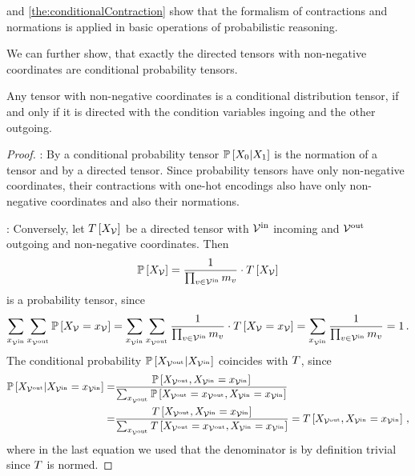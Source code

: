  and \ref{the:conditionalContraction} show that the formalism of contractions and normations is applied in basic operations of probabilistic reasoning.

We can further show, that exactly the directed tensors with non-negative coordinates are conditional probability tensors.

\begin{theorem}\label{the:conditionalDirected}
	Any tensor with non-negative coordinates is a conditional distribution tensor, if and only if it is directed with the condition variables ingoing and the other outgoing.
\end{theorem}
\begin{proof}
	\proofrightsymbol:
	By  a conditional probability tensor $\mathbb{P}\left[X_{0}|X_{1}\right]$ is the normation of a tensor and by  a directed tensor.
	Since probability tensors have only non-negative coordinates, their contractions with one-hot encodings also have only non-negative coordinates and also their normations. 
	
	\proofleftsymbol:
	Conversely, let $T\left[X_{\mathcal{V}}\right]$ be a directed tensor with $\mathcal{V}^{\mathrm{in}}$ incoming and $\mathcal{V}^{\mathrm{out}}$ outgoing and non-negative coordinates.
	Then
	\begin{align}
		\mathbb{P}\left[X_{\mathcal{V}}\right] = \frac{1}{\prod_{v\in\mathcal{V}^{\mathrm{in}}}m_{v}} \cdot T\left[X_{\mathcal{V}}\right]
	\end{align}
	is a probability tensor, since 
	\begin{align*}
		\sum_{x_{\mathcal{V}^{\mathrm{in}}}} \sum_{x_{\mathcal{V}^{\mathrm{out}}}} \mathbb{P}\left[X_{\mathcal{V}}=x_{\mathcal{V}}\right] =
		\sum_{x_{\mathcal{V}^{\mathrm{in}}}} \sum_{x_{\mathcal{V}^{\mathrm{out}}}} \frac{1}{\prod_{v\in\mathcal{V}^{\mathrm{in}}}m_{v}} \cdot T\left[X_{\mathcal{V}}=x_{\mathcal{V}}\right] =
		\sum_{x_{\mathcal{V}^{\mathrm{in}}}} \frac{1}{\prod_{v\in\mathcal{V}^{\mathrm{in}}}m_{v}} = 1 \, . 
	\end{align*}
	The conditional probability $\mathbb{P}\left[X_{\mathcal{V}^{\mathrm{out}}}|X_{\mathcal{V}^{\mathrm{in}}}\right]$ coincides with $T$, since
	\begin{align*}
		\mathbb{P}\left[X_{\mathcal{V}^{\mathrm{out}}}|X_{\mathcal{V}^{\mathrm{in}}}=x_{\mathcal{V}^{\mathrm{in}}}\right] 
		=& \frac{
		\mathbb{P}\left[X_{\mathcal{V}^{\mathrm{out}}},X_{\mathcal{V}^{\mathrm{in}}}=x_{\mathcal{V}^{\mathrm{in}}}\right]
		}{
		\sum_{x_{\mathcal{V}^{\mathrm{out}}}} \mathbb{P}\left[X_{\mathcal{V}^{\mathrm{out}}}=x_{\mathcal{V}^{\mathrm{out}}},X_{\mathcal{V}^{\mathrm{in}}}=x_{\mathcal{V}^{\mathrm{in}}}\right]
		} \\
		=& \frac{
		T\left[X_{\mathcal{V}^{\mathrm{out}}},X_{\mathcal{V}^{\mathrm{in}}}=x_{\mathcal{V}^{\mathrm{in}}}\right]
		}{
		\sum_{x_{\mathcal{V}^{\mathrm{out}}}} T\left[X_{\mathcal{V}^{\mathrm{out}}}=x_{\mathcal{V}^{\mathrm{out}}},X_{\mathcal{V}^{\mathrm{in}}}=x_{\mathcal{V}^{\mathrm{in}}}\right]
		} 
		= T\left[X_{\mathcal{V}^{\mathrm{out}}},X_{\mathcal{V}^{\mathrm{in}}}=x_{\mathcal{V}^{\mathrm{in}}}\right] \, ,
	\end{align*}
	where in the last equation we used that the denominator is by definition trivial since $T$ is normed.
\end{proof}


